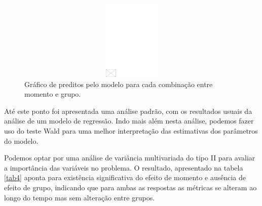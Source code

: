 \documentclass[AMA,STIX1COL]{WileyNJD-v2}
\begin{document}
\begin{figure}[h]
\centerline{\includegraphics[width=342pt,height=9pc,draft]{empty}}
\caption{Gráfico de preditos pelo modelo para cada combinação entre momento e grupo.\label{fig6}}
\end{figure}

  
Até este ponto foi apresentada uma análise padrão, com os resultados usuais da análise de um modelo de regressão. Indo mais além nesta análise, podemos fazer uso do teste Wald para uma melhor interpretação das estimativas dos parâmetros do modelo. 

Podemos optar por uma análise de variância multivariada do tipo II para avaliar a importância das variáveis no problema. O resultado, apresentado na tabela \autoref{tab4} aponta para existência significativa do efeito de momento e ausência de efeito de grupo, indicando que para ambas as respostas as métricas se alteram ao longo do tempo mas sem alteração entre grupos.
\end{document}
